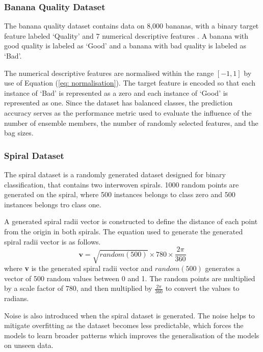 \documentclass[10pt, conference]{IEEEtran}
\begin{document}
\subsubsection{Banana Quality Dataset}

The banana quality dataset contains data on 8,000 bananas, with a binary target feature labeled `Quality' and
7 numerical descriptive features \cite{Banana_ref}. A banana with good quality is labeled as `Good' and a banana with bad quality is
labeled as `Bad'.

The numerical descriptive features are normalised within the range $[-1,1]$ by use of Equation (\ref{eq: normalisation}).
The target feature is encoded so that each instance of `Bad' is represented as a zero and each instance of `Good' is represented as one.
Since the dataset has balanced classes, the prediction accuracy serves as the performance
metric used to evaluate the influence of the number of ensemble members, the number of randomly selected features,
and the bag sizes.

\subsubsection{Spiral Dataset}

The spiral dataset is a randomly generated dataset designed for binary classification, that contains two interwoven
spirals. 1000 random points are generated on the spiral, where 500 instances belongs to class zero and 500
instances belongs tro class one.

A generated spiral radii vector is constructed to define the distance of each point
from the origin in both spirals. The equation used to generate the generated spiral radii vector
is as follows.
\begin{equation}
    \textbf{v} = \sqrt{random\left(500\right)} \times 780 \times \frac{2 \pi}{360} \label{eq: radii}
\end{equation}
where \textbf{v} is the generated spiral radii vector and $random(500)$ generates a vector of 500 random
values between 0 and 1. The random points are multiplied
by a scale factor of $780$, and then multiplied by $\frac{2 \pi}{360}$ to convert the values
to radians.

Noise is also introduced when the spiral dataset is generated. The noise helps to mitigate overfitting
as the dataset becomes less predictable, which forces the models to learn broader patterns which improves
the generalisation of the models on unseen data.
\end{document}
